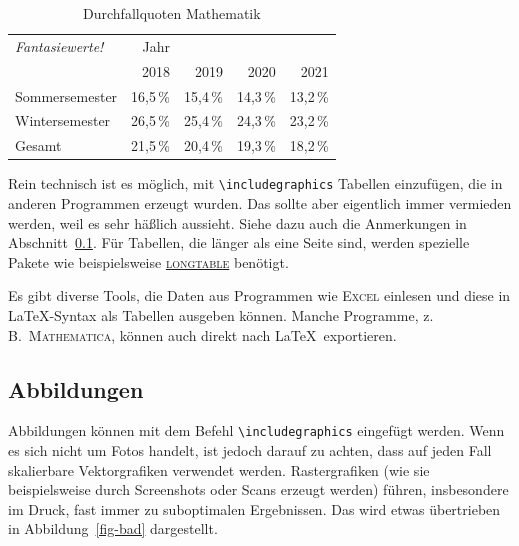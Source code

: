 \begin{table}[!ht]
  \caption{Durchfallquoten Mathematik}
  \centering
  \begin{tabular}{lrrrr}
    \toprule
    \textit{\color{gray}Fantasiewerte!}&Jahr&&& \\[-2pt]
    &2018&2019&2020&2021 \\
    \cmidrule(lr){2-2}
    \cmidrule(lr){3-3}
    \cmidrule(lr){4-4}
    \cmidrule(lr){5-5}
    Sommersemester&16{,}5\,\%&15{,}4\,\%&14{,}3\,\%&13{,}2\,\%\\
    Wintersemester&26{,}5\,\%&25{,}4\,\%&24{,}3\,\%&23{,}2\,\%\\
    \cmidrule[0.8pt](lr){1-1}
    \cmidrule(lr){2-2}
    \cmidrule(lr){3-3}
    \cmidrule(lr){4-4}
    \cmidrule(lr){5-5}
    Gesamt&21{,}5\,\%&20{,}4\,\%&19{,}3\,\%&18{,}2\,\%\\
    \bottomrule
  \end{tabular}
  \label{tab-fail}
\end{table}

Rein technisch ist es möglich, mit \verb|\includegraphics| Tabellen
einzufügen, die in anderen Programmen erzeugt wurden.  Das sollte aber
eigentlich immer vermieden werden, weil es sehr häßlich aussieht.  Siehe dazu
auch die Anmerkungen in Abschnitt~\ref{sec-fig}.
Für Tabellen, die länger als eine Seite sind, werden spezielle Pakete wie
beispielsweise \href{https://ctan.org/pkg/longtable}{\textsc{longtable}}
benötigt.

Es gibt diverse Tools, die Daten aus Programmen wie \textsc{Excel} einlesen
und diese in \LaTeX-Syntax als Tabellen ausgeben können.  Manche Programme,
z.\,B.\ \textsc{Mathematica}, können auch direkt nach \LaTeX\ exportieren.

\subsection{Abbildungen}\label{sec-fig}

Abbildungen können mit dem Befehl \verb|\includegraphics| eingefügt werden.
Wenn es sich nicht um Fotos handelt, ist jedoch darauf zu achten, dass auf
jeden Fall skalierbare Vektorgrafiken verwendet werden.  Rastergrafiken (wie
sie beispielsweise durch Screenshots oder Scans erzeugt werden) führen,
insbesondere im Druck, fast immer zu suboptimalen Ergebnissen.  Das wird etwas
übertrieben in Abbildung~\ref{fig-bad} dargestellt.

